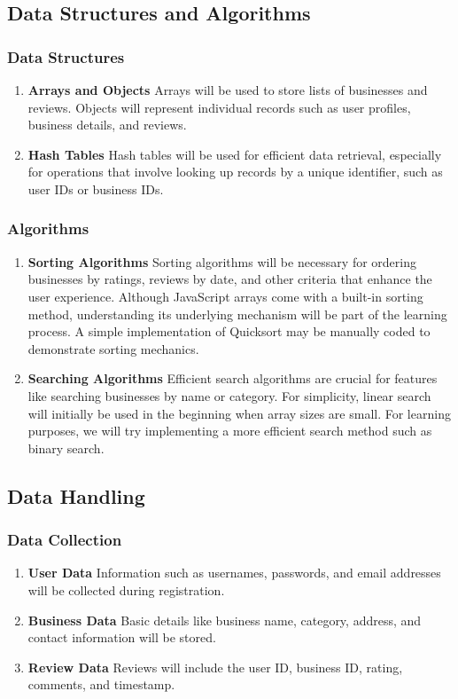 \documentclass[10pt,twocolumn]{article}
\begin{document}
    \subsection{Data Structures and Algorithms}
    \subsubsection{Data Structures}
    \begin{enumerate}
        \item \textbf{Arrays and Objects} Arrays will be used to store lists of businesses and reviews. Objects will represent individual records such as user profiles, business details, and reviews.
        \item \textbf{Hash Tables} Hash tables will be used for efficient data retrieval, especially for operations that involve looking up records by a unique identifier, such as user IDs or business IDs.
    \end{enumerate}
    \subsubsection{Algorithms}
    \begin{enumerate}
        \item \textbf{Sorting Algorithms} Sorting algorithms will be necessary for ordering businesses by ratings, reviews by date, and other criteria that enhance the user experience. Although JavaScript arrays come with a built-in sorting method, understanding its underlying mechanism will be part of the learning process. A simple implementation of Quicksort may be manually coded to demonstrate sorting mechanics.
        \item \textbf{Searching Algorithms} Efficient search algorithms are crucial for features like searching businesses by name or category. For simplicity, linear search will initially be used in the beginning when array sizes are small. For learning purposes, we will try implementing a more efficient search method such as binary search.
    \end{enumerate}

    \subsection{Data Handling}
    \subsubsection{Data Collection}
    \begin{enumerate}
        \item \textbf{User Data} Information such as usernames, passwords, and email addresses will be collected during registration.
        \item \textbf{Business Data} Basic details like business name, category, address, and contact information will be stored.
        \item \textbf{Review Data} Reviews will include the user ID, business ID, rating, comments, and timestamp.
    \end{enumerate}
\end{document}
